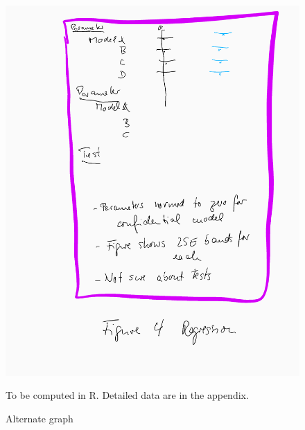 

\begin{figure} [H]
\centering
\label{tab:all:estimates}
\includegraphics[width=.8\linewidth]{graphs/Figure4-placeholder.png} 
\caption{Alternate graph} 
\begin{minipage}{0.48\linewidth}
{\footnotesize To be computed in R. Detailed data are in the appendix. \par}
\end{minipage}
\end{figure}